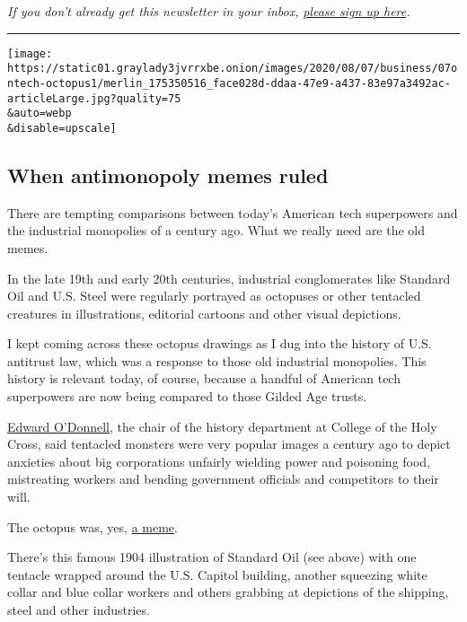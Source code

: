\emph{If you don't already get this newsletter in your inbox,}
\href{https://www.nytimes3xbfgragh.onion/newsletters/signup/OT}{\emph{please
sign up here}}\emph{.}

\begin{center}\rule{0.5\linewidth}{\linethickness}\end{center}

\texttt{[image: https://static01.graylady3jvrrxbe.onion/images/2020/08/07/business/07ontech-octopus1/merlin\_175350516\_face028d-ddaa-47e9-a437-83e97a3492ac-articleLarge.jpg?quality=75\\\&auto=webp\\\&disable=upscale]}

\hypertarget{when-antimonopoly-memes-ruled}{%
\subsection{When antimonopoly memes
ruled}\label{when-antimonopoly-memes-ruled}}

There are tempting comparisons between today's American tech superpowers
and the industrial monopolies of a century ago. What we really need are
the old memes.

In the late 19th and early 20th centuries, industrial conglomerates like
Standard Oil and U.S. Steel were regularly portrayed as octopuses or
other tentacled creatures in illustrations, editorial cartoons and other
visual depictions.

I kept coming across these octopus drawings as I dug into the history of
U.S. antitrust law, which was a response to those old industrial
monopolies. This history is relevant today, of course, because a handful
of American tech superpowers are now being compared to those Gilded Age
trusts.

\href{https://www.holycross.edu/academics/programs/history/faculty/edward-t-odonnell}{Edward
O'Donnell}, the chair of the history department at College of the Holy
Cross, said tentacled monsters were very popular images a century ago to
depict anxieties about big corporations unfairly wielding power and
poisoning food, mistreating workers and bending government officials and
competitors to their will.

The octopus was, yes,
\href{https://en.wikipedia.org/wiki/Internet_meme}{a meme}.

There's this famous 1904 illustration of Standard Oil (see above) with
one tentacle wrapped around the U.S. Capitol building, another squeezing
white collar and blue collar workers and others grabbing at depictions
of the shipping, steel and other industries.

